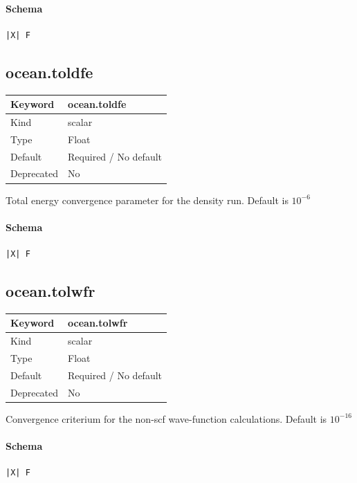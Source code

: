 \documentclass[11pt]{article}
\begin{document}
{{{{{\paragraph{Schema}
\begin{Verbatim}
|X| F
\end{Verbatim}

\subsection{ocean.toldfe}
\label{kw:ocean-toldfe}
\begin{longtable}{|p{1.5in}|p{4.5in}|}
\hline
Keyword & ocean.toldfe \\
\hline
Kind & scalar \\
\hline
Type & Float \\
\hline
Default & Required / No default \\
\hline
Deprecated & No \\
\hline
\end{longtable}
 Total energy convergence parameter for the density run. Default is $10^{-6}$

\paragraph{Schema}
\begin{Verbatim}
|X| F
\end{Verbatim}

\subsection{ocean.tolwfr}
\label{kw:ocean-tolwfr}
\begin{longtable}{|p{1.5in}|p{4.5in}|}
\hline
Keyword & ocean.tolwfr \\
\hline
Kind & scalar \\
\hline
Type & Float \\
\hline
Default & Required / No default \\
\hline
Deprecated & No \\
\hline
\end{longtable}
 Convergence criterium for the non-scf wave-function calculations.
 Default is $10^{-16}$

\paragraph{Schema}
\begin{Verbatim}
|X| F
\end{Verbatim}

}}}}}
\end{document}
